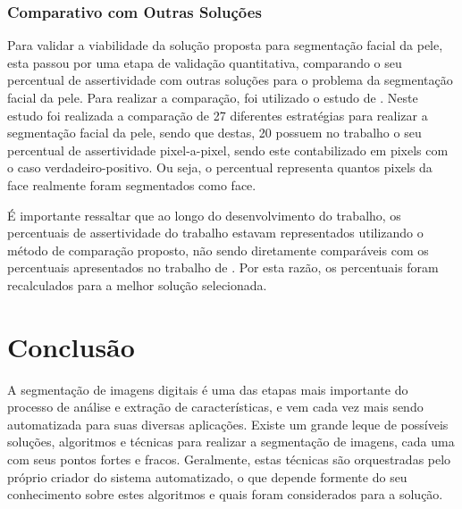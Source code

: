 \documentclass[12pt,oneside,a4paper,english,french,spanish,brazil,]{abntex2}
\begin{document}
\subsection{Comparativo com Outras Soluções}

Para validar a viabilidade da solução proposta para segmentação facial da pele, esta passou por uma etapa de validação quantitativa, comparando o seu percentual de assertividade com outras soluções para o problema da segmentação facial da pele. Para realizar a comparação, foi utilizado o estudo de \citet{kakumanu:2007}. Neste estudo foi realizada a comparação de 27 diferentes estratégias para realizar a segmentação facial da pele, sendo que destas, 20 possuem no trabalho o seu percentual de assertividade pixel-a-pixel, sendo este contabilizado em pixels com o caso verdadeiro-positivo. Ou seja, o percentual representa quantos pixels da face realmente foram segmentados como face.

É importante ressaltar que ao longo do desenvolvimento do trabalho, os percentuais de assertividade do trabalho estavam representados utilizando o método de comparação proposto, não sendo diretamente comparáveis com os percentuais apresentados no trabalho de \citet{kakumanu:2007}. Por esta razão, os percentuais foram recalculados para a melhor solução selecionada.


% 

\chapter{Conclusão}
\label{chap:Conclusao}
\label{chap:ultimo}

A segmentação de imagens digitais é uma das etapas mais importante do processo de análise e extração de características, e vem cada vez mais sendo automatizada para suas diversas aplicações. Existe um grande leque de possíveis soluções, algoritmos e técnicas para realizar a segmentação de imagens, cada uma com seus pontos fortes e fracos. Geralmente, estas técnicas são orquestradas pelo próprio criador do sistema automatizado, o que depende formente do seu conhecimento sobre estes algoritmos e quais foram considerados para a solução.
\end{document}
